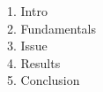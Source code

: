 \documentclass[preview]{standalone}
\begin{document}
\begin{center}
\begin{flushleft} 1. Intro\\ 2. Fundamentals\\ 3. Issue\\ 4. Results\\ 5. Conclusion\end{flushleft}
\end{center}
\end{document}
